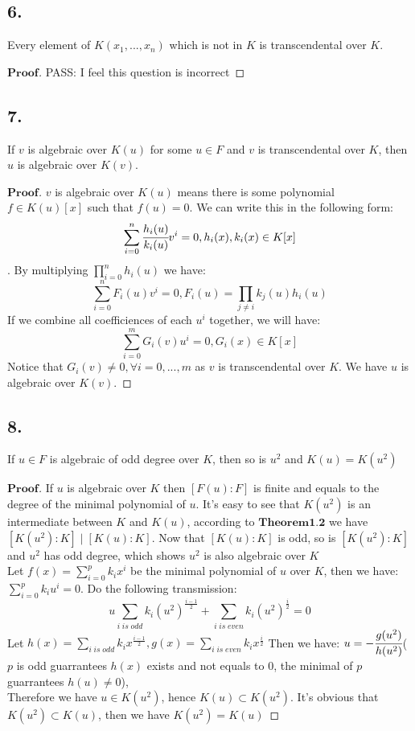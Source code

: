 \documentclass[a4paper, 11pt]{article}
\newenvironment{myprf}
{\renewcommand\qedsymbol{$ $}\begin{proof}[$\mathbf{Proof}$]}
  {\end{proof}}
\begin{document}
\subsection*{6.}
Every element of $K(x_1,...,x_n)$ which is not in $K$ is transcendental over $K$.
\begin{myprf}
       PASS: I feel this question is incorrect
\end{myprf}
\subsection*{7.}
If $v$ is algebraic over $K(u)$ for some $u\in F$ and $v$ is transcendental over $K$,
then $u$ is algebraic over $K(v)$.
\begin{myprf}
    $v$ is algebraic over $K(u)$ means there is some polynomial $f\in K(u)[x]$ such that
    $f(u)=0$. We can write this in the following form:
    $$
    \sum_{i=0}^{n}\cfrac{h_i(u)}{k_i(u)} v^{i} = 0, h_i(x),k_i(x)\in K[x]
    $$. By multiplying $\displaystyle \prod_{i=0}^n h_i(u)$ we have:
    $$
    \sum_{i=0}^{n}F_i(u)v^{i}=0, F_i(u)=\prod_{j\neq i}k_j(u)h_i(u)
    $$ If we combine all coefficiences of each $u^i$ together, we will have:
    $$
    \sum_{i=0}^{m}G_i(v)u^i=0, G_i(x)\in K[x]
    $$ Notice that $G_i(v)\neq 0,\forall i=0,...,m$ as $v$ is transcendental over $K$. 
    We have $u$ is algebraic over $K(v)$.
\end{myprf}

\subsection*{8.}
If $u\in F$ is algebraic of odd degree over $K$, then so is $u^2$ and $K(u)=K(u^2)$
\begin{myprf}
        If $u$ is algebraic over $K$ then $[F(u):F]$ is finite and equals to the degree
        of the minimal polynomial of $u$. It's easy to see that $K(u^2)$ is an 
        intermediate between $K$ and $K(u)$, according to $\textbf{Theorem1.2}$ we have
        $[K(u^2):K] \mid [K(u):K]$. Now that $[K(u):K]$ is odd, so is $[K(u^2):K]$ and 
        $u^2$ has odd degree, which shows $u^2$ is also algebraic over $K$\\
        \indent
         Let $f(x)=\displaystyle \sum_{i=0}^{p}k_ix^i$ be the minimal polynomial
        of $u$ over $K$, then we have:$\displaystyle \sum_{i=0}^p k_iu^i=0$. Do the 
        following transmission:
        $$
        u\sum_{i\;is\; odd}k_i(u^2)^{\frac{i-1}{2}}+\sum_{i\; is\; even}k_i(u^2)^
        {\frac{i}{2}} = 0
        $$ Let $\displaystyle h(x)=\sum_{i\;is\;odd}k_ix^{\frac{i-1}{2}},
        g(x)=\sum_{i\;is\;even}k_ix^{\frac{i}{2}}$ Then we have: $u=-\cfrac{g(u^2)}{h(u^2)}$($p$ is odd guarrantees $h(x)$ exists and not equals to 0, the minimal of $p$ guarrantees $h(u)\neq 0$),
        \\\indent Therefore we have $u\in K(u^2)$, hence $K(u)\subset K(u^2)$. It's obvious that
        $K(u^2)\subset K(u)$, then we have $K(u^2)=K(u)$
       
\end{myprf}
\end{document}
